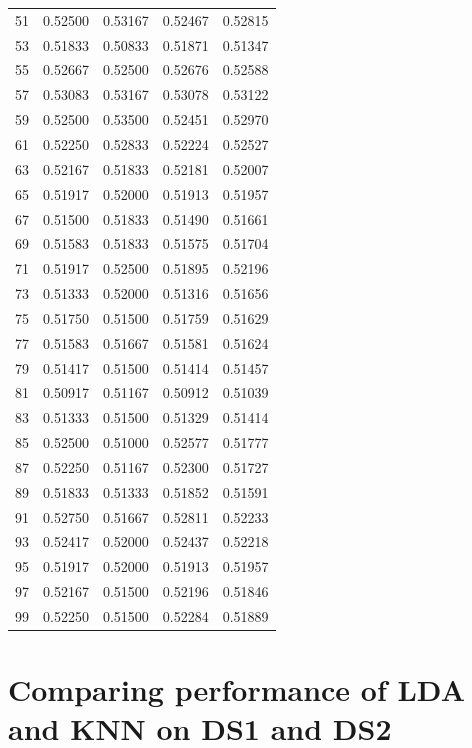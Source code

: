 \documentclass{article}
\begin{document}
\begin{center}
\begin{tabular}{ |c|c|c|c|c| }
    51 &  0.52500 &  0.53167 &  0.52467 &  0.52815 \\
    53 &  0.51833 &  0.50833 &  0.51871 &  0.51347 \\
    55 &  0.52667 &  0.52500 &  0.52676 &  0.52588 \\
    57 &  0.53083 &  0.53167 &  0.53078 &  0.53122 \\
    59 &  0.52500 &  0.53500 &  0.52451 &  0.52970 \\
    61 &  0.52250 &  0.52833 &  0.52224 &  0.52527 \\
    63 &  0.52167 &  0.51833 &  0.52181 &  0.52007 \\
    65 &  0.51917 &  0.52000 &  0.51913 &  0.51957 \\
    67 &  0.51500 &  0.51833 &  0.51490 &  0.51661 \\
    69 &  0.51583 &  0.51833 &  0.51575 &  0.51704 \\
    71 &  0.51917 &  0.52500 &  0.51895 &  0.52196 \\
    73 &  0.51333 &  0.52000 &  0.51316 &  0.51656 \\
    75 &  0.51750 &  0.51500 &  0.51759 &  0.51629 \\
    77 &  0.51583 &  0.51667 &  0.51581 &  0.51624 \\
    79 &  0.51417 &  0.51500 &  0.51414 &  0.51457 \\
    81 &  0.50917 &  0.51167 &  0.50912 &  0.51039 \\
    83 &  0.51333 &  0.51500 &  0.51329 &  0.51414 \\
    85 &  0.52500 &  0.51000 &  0.52577 &  0.51777 \\
    87 &  0.52250 &  0.51167 &  0.52300 &  0.51727 \\
    89 &  0.51833 &  0.51333 &  0.51852 &  0.51591 \\
    91 &  0.52750 &  0.51667 &  0.52811 &  0.52233 \\
    93 &  0.52417 &  0.52000 &  0.52437 &  0.52218 \\
    95 &  0.51917 &  0.52000 &  0.51913 &  0.51957 \\
    97 &  0.52167 &  0.51500 &  0.52196 &  0.51846 \\
    99 &  0.52250 &  0.51500 &  0.52284 &  0.51889 \\
  \hline
\end{tabular}
\end{center}

\section{Comparing performance of LDA and KNN on DS1 and DS2}
\end{document}
